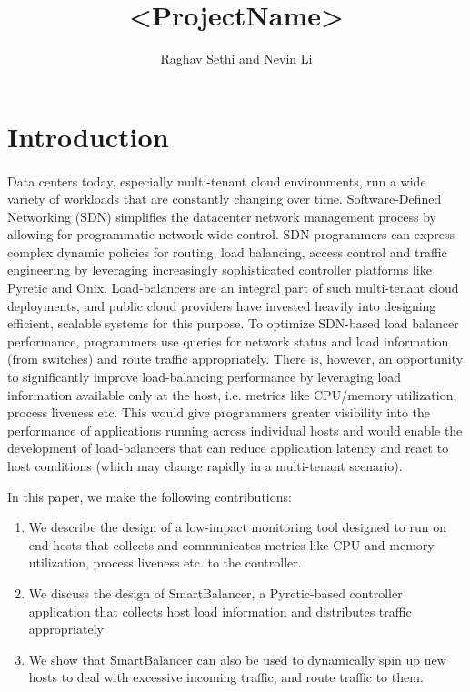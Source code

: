 \documentclass[10pt]{article}
\begin{document}
\title{<ProjectName>}
\author{Raghav Sethi and Nevin Li}
\date{}
\maketitle

\section{Introduction}

\paragraph{} Data centers today, especially multi-tenant cloud environments, run a wide variety of workloads that are constantly changing over time. Software-Defined Networking (SDN) simplifies the datacenter network management process by allowing for programmatic network-wide control. SDN programmers can express complex dynamic policies for routing, load balancing, access control and traffic engineering by leveraging increasingly sophisticated controller platforms like Pyretic\cite{Pyretic} and Onix\cite{Onix}. Load-balancers are an integral part of such multi-tenant cloud deployments, and public cloud providers have invested heavily into designing efficient, scalable systems for this purpose\cite{Ananta}. To optimize SDN-based load balancer performance, programmers use queries for network status and load information (from switches) and route traffic appropriately. There is, however, an opportunity to significantly improve load-balancing performance by leveraging load information available only at the host, i.e. metrics like CPU/memory utilization, process liveness etc. This would give programmers greater visibility into the performance of applications running across individual hosts and would enable the development of load-balancers that can reduce application latency and react to host conditions (which may change rapidly in a multi-tenant scenario).

In this paper, we make the following contributions:
\begin{enumerate}
\item We describe the design of a low-impact monitoring tool designed to run on end-hosts that collects and communicates metrics like CPU and memory utilization, process liveness etc. to the controller.
\item We discuss the design of SmartBalancer, a Pyretic-based controller application that collects host load information and distributes traffic appropriately
\item We show that SmartBalancer can also be used to dynamically spin up new hosts to deal with excessive incoming traffic, and route traffic to them.
\end{enumerate}
\end{document}
